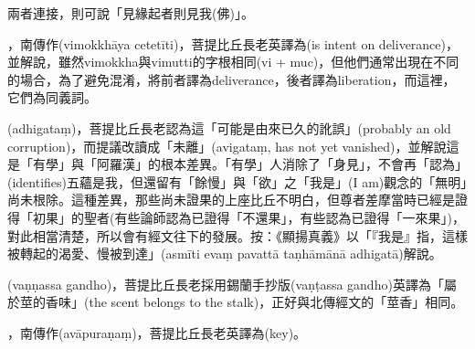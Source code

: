 \startitemgroup[noteitems]
\item{}兩者連接，則可說「見緣起者則見我(佛)」。
\stopitemgroup

\startitemgroup[noteitems]
\item{}，南傳作(vimokkhāya cetetīti)，菩提比丘長老英譯為(is intent on deliverance)，並解說，雖然vimokkha與vimutti的字根相同(vi + muc)，但他們通常出現在不同的場合，為了避免混淆，將前者譯為deliverance，後者譯為liberation，而這裡，它們為同義詞。
\stopitemgroup

\startitemgroup[noteitems]
\item{}(adhigataṃ)，菩提比丘長老認為這「可能是由來已久的訛誤」(probably an old corruption)，而提議改讀成「未離」(avigataṃ, has not yet vanished)，並解說這是「有學」與「阿羅漢」的根本差異。「有學」人消除了「身見」，不會再「認為」(identifies)五蘊是我，但還留有「餘慢」與「欲」之「我是」(I am)觀念的「無明」尚未根除。這種差異，那些尚未證果的上座比丘不明白，但尊者差摩當時已經是證得「初果」的聖者(有些論師認為已證得「不還果」，有些認為已證得「一來果」)，對此相當清楚，所以會有經文往下的發展。按：《顯揚真義》以「『我是』指，這樣被轉起的渴愛、慢被到達」(asmīti evaṃ pavattā taṇhāmānā adhigatā)解說。
\stopitemgroup

\startitemgroup[noteitems]
\item{}(vaṇṇassa gandho)，菩提比丘長老採用錫蘭手抄版(vaṇṭassa gandho)英譯為「屬於莖的香味」(the scent belongs to the stalk)，正好與北傳經文的「莖香」相同。
\stopitemgroup

\startitemgroup[noteitems]
\item{}，南傳作(avāpuraṇaṃ)，菩提比丘長老英譯為(key)。
\stopitemgroup


